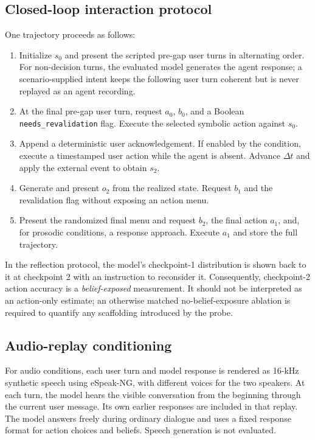 \documentclass{article}
\begin{document}
\subsection{Closed-loop interaction protocol}

One trajectory proceeds as follows:
\begin{enumerate}
  \item Initialize $s_0$ and present the scripted pre-gap user turns in alternating order. For non-decision turns, the evaluated model generates the agent response; a scenario-supplied intent keeps the following user turn coherent but is never replayed as an agent recording.
  \item At the final pre-gap user turn, request $a_0$, $b_0$, and a Boolean \texttt{needs\_revalidation} flag. Execute the selected symbolic action against $s_0$.
  \item Append a deterministic user acknowledgement. If enabled by the condition, execute a timestamped user action while the agent is absent. Advance $\Delta t$ and apply the external event to obtain $s_2$.
  \item Generate and present $o_2$ from the realized state. Request $b_1$ and the revalidation flag without exposing an action menu.
  \item Present the randomized final menu and request $b_2$, the final action $a_1$, and, for prosodic conditions, a response approach. Execute $a_1$ and store the full trajectory.
\end{enumerate}

In the reflection protocol, the model's checkpoint-1 distribution is shown back to it at checkpoint 2 with an instruction to reconsider it. Consequently, checkpoint-2 action accuracy is a \emph{belief-exposed} measurement. It should not be interpreted as an action-only estimate; an otherwise matched no-belief-exposure ablation is required to quantify any scaffolding introduced by the probe.

\subsection{Audio-replay conditioning}

For audio conditions, each user turn and model response is rendered as 16-kHz synthetic speech using eSpeak-NG, with different voices for the two speakers. At each turn, the model hears the visible conversation from the beginning through the current user message. Its own earlier responses are included in that replay. The model answers freely during ordinary dialogue and uses a fixed response format for action choices and beliefs. Speech generation is not evaluated.
\end{document}
